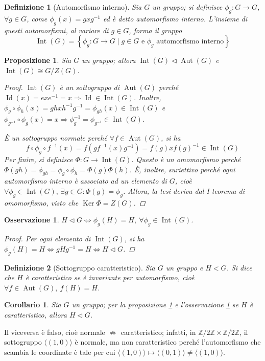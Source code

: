 \documentclass[11pt]{scrartcl}
\theoremstyle{style1}
\newtheorem{osservazione}{Osservazione}[section]
\newtheorem{prop}{Proposizione}[section]
\newtheorem{corollario}{Corollario}[teorema]
\newtheorem{definizione}{Definizione}[section]
\numberwithin{equation}{subsection}
\begin{document}
\begin{definizione}
	[Automorfismo interno]
	Sia $G$ un gruppo; si definisce $\phi _g :G\to G$, $ \forall g \in G$, come $\phi_g (x) =gxg^{-1} $ ed \`e detto \textit{automorfismo interno}. 
	L'insieme di questi automorfismi, al variare di $g \in G$, forma il gruppo
	\[
	\operatorname{Int} (G) = \left\{ \phi _g : G\to G  \mid g \in G \text{ e } \phi _g \text{ automorfismo interno} \right\} 
	\] 
\end{definizione}
\begin{prop}\label{intcar}
	Sia $G$ un gruppo; allora $\operatorname{Int} (G) \lhd \operatorname{Aut} (G)$ e $\operatorname{Int} (G) \cong G / Z(G)$.
	\begin{proof}
		$\operatorname{Int} (G)$ \`e un sottogruppo di $\operatorname{Aut} (G)$ perch\'e $\operatorname{Id} (x) = exe^{-1} = x  \Rightarrow \operatorname{Id} \in \operatorname{Int} (G)$.
		Inoltre, $\phi _g \circ \phi _h (x) = ghxh^{-1}g^{-1}=\phi _{gh} (x) \in \operatorname{Int} (G)$ e $\phi _{g^{-1} } \circ \phi _g (x) = x \Rightarrow \phi _g^{-1} = \phi _{g^{-1}} \in \operatorname{Int}(G)  $.

		\`E un sottogruppo normale perch\'e $\forall f \in \operatorname{Aut} (G)$, si ha 
		\[
		f \circ \phi _g \circ f^{-1}(x) = f \left(g f^{-1}(x) g^{-1}\right) =f(g) x f(g)^{-1} \in \operatorname{Int} (G)
		\] 
		Per finire, si definisce $\Phi : G \to \operatorname{Int} (G) $.
		Questo \`e un omomorfismo perch\'e $\Phi(gh)=\phi _{gh} = \phi _g\circ \phi _h = \Phi(g)\Phi(h)$.
		\`E, inoltre, suriettivo perch\'e ogni automorfismo interno \`e associato ad un elemento di $G$, cio\`e $\forall \phi _g \in \operatorname{Int} (G), \ \exists g \in G : \Phi(g) = \phi _g$.
		Allora, la tesi deriva dal I teorema di omomorfismo, visto che $\operatorname{Ker} \Phi = Z(G)$.
	\end{proof}
\end{prop}
\begin{osservazione}\label{ossnorm}
	$H \lhd G \iff \phi _g(H) = H, \ \forall \phi _g \in \operatorname{Int} (G)$.
	\begin{proof}
Per ogni elemento di $\operatorname{Int} (G)$, si ha $\phi _g (H) = H \iff gH g^{-1} = H \iff H \lhd G$.
	\end{proof}
	\end{osservazione}
\begin{definizione}
	[Sottogruppo caratteristico]
	Sia $G$ un gruppo e $H < G$. Si dice che $H$ \`e \textit{caratteristico} se \`e invariante per automorfismo, cio\`e $\forall f \in \operatorname{Aut} (G), \ f(H) = H$.
\end{definizione}
\begin{corollario}
	Sia $G$ un gruppo; per la proposizione \ref{intcar} e l'osservazione \ref{ossnorm} se $H$ \`e caratteristico, allora $H \lhd G$.
\end{corollario}
\noindent Il viceversa \`e falso, cio\`e normale $\not\Rightarrow $ caratteristico; infatti, in $\mathbb{Z} / 2\mathbb{Z} \times  \mathbb{Z} / 2\mathbb{Z}$, il sottogruppo $\langle (1,0) \rangle$ \`e normale, ma non caratteristico perch\'e l'automorfismo che scambia le coordinate \`e tale per cui $\langle (1,0) \rangle\mapsto \langle (0,1) \rangle\neq \langle (1,0) \rangle$.
\end{document}
